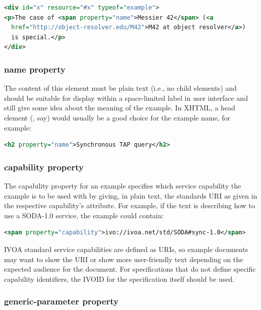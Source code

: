 \documentclass[11pt,letter]{ivoa}
\begin{document}
\begin{lstlisting}[language=XML]
<div id="x" resource="#x" typeof="example">
<p>The case of <span property="name">Messier 42</span> (<a
  href="http://object-resolver.edu/M42">M42 at object resolver</a>)
  is special.</p>
</div>
\end{lstlisting}

\subsubsection{name property}

The content of this element must be plain text (i.e., no child
elements) and
should be suitable for display within a 
space-limited label in user interface and still give some idea about the meaning 
of the example.  In XHTML, a head element (, say) would usually be a good 
choice for the example name, for example:

\begin{lstlisting}[language=XML]
<h2 property="name">Synchronous TAP query</h2>
\end{lstlisting}

\subsubsection{capability property}

The capability property for an example specifies which service capability the 
example is to be used with by giving, in plain text, the standards URI
as given in the respective capability's  attribute. 
For example, if the text is describing how to use a
SODA-1.0 service, the example could contain:

\begin{lstlisting}[language=XML]
<span property="capability">ivo://ivoa.net/std/SODA#sync-1.0</span>
\end{lstlisting}

IVOA standard service capabilities are defined as URIs,  so example documents 
may want to show the URI or show more user-friendly text depending on the 
expected audience for the document. For specifications that do not define 
specific capability identifiers, the IVOID for the specification itself should 
be used.

\subsubsection{generic-parameter property}
\end{document}
